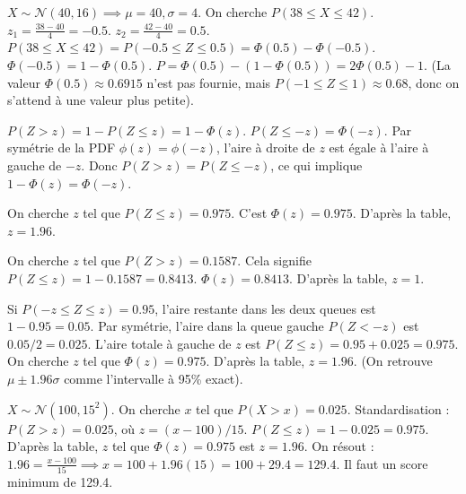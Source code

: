 \begin{correctionbox}
$X \sim \mathcal{N}(40, 16) \implies \mu=40, \sigma=4$.
On cherche $P(38 \le X \le 42)$.
$z_1 = \frac{38 - 40}{4} = -0.5$. $z_2 = \frac{42 - 40}{4} = 0.5$.
$P(38 \le X \le 42) = P(-0.5 \le Z \le 0.5) = \Phi(0.5) - \Phi(-0.5)$.
$\Phi(-0.5) = 1 - \Phi(0.5)$.
$P = \Phi(0.5) - (1 - \Phi(0.5)) = 2\Phi(0.5) - 1$.
(La valeur $\Phi(0.5) \approx 0.6915$ n'est pas fournie, mais $P(-1 \le Z \le 1) \approx 0.68$, donc on s'attend à une valeur plus petite).
\end{correctionbox}

\begin{correctionbox}
$P(Z > z) = 1 - P(Z \le z) = 1 - \Phi(z)$.
$P(Z \le -z) = \Phi(-z)$.
Par symétrie de la PDF $\phi(z) = \phi(-z)$, l'aire à droite de $z$ est égale à l'aire à gauche de $-z$.
Donc $P(Z > z) = P(Z \le -z)$, ce qui implique $1 - \Phi(z) = \Phi(-z)$.
\end{correctionbox}

\begin{correctionbox}
On cherche $z$ tel que $P(Z \le z) = 0.975$.
C'est $\Phi(z) = 0.975$. D'après la table, $z = 1.96$.
\end{correctionbox}

\begin{correctionbox}
On cherche $z$ tel que $P(Z > z) = 0.1587$.
Cela signifie $P(Z \le z) = 1 - 0.1587 = 0.8413$.
$\Phi(z) = 0.8413$. D'après la table, $z = 1$.
\end{correctionbox}

\begin{correctionbox}
Si $P(-z \le Z \le z) = 0.95$, l'aire restante dans les deux queues est $1 - 0.95 = 0.05$.
Par symétrie, l'aire dans la queue gauche $P(Z < -z)$ est $0.05 / 2 = 0.025$.
L'aire totale à gauche de $z$ est $P(Z \le z) = 0.95 + 0.025 = 0.975$.
On cherche $z$ tel que $\Phi(z) = 0.975$.
D'après la table, $z = 1.96$. (On retrouve $\mu \pm 1.96\sigma$ comme l'intervalle à 95\% exact).
\end{correctionbox}

\begin{correctionbox}
$X \sim \mathcal{N}(100, 15^2)$. On cherche $x$ tel que $P(X > x) = 0.025$.
Standardisation : $P(Z > z) = 0.025$, où $z = (x-100)/15$.
$P(Z \le z) = 1 - 0.025 = 0.975$.
D'après la table, $z$ tel que $\Phi(z)=0.975$ est $z=1.96$.
On résout : $1.96 = \frac{x - 100}{15} \implies x = 100 + 1.96(15) = 100 + 29.4 = 129.4$.
Il faut un score minimum de 129.4.
\end{correctionbox}

